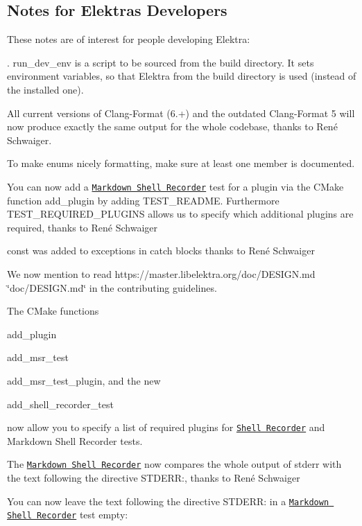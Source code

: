 \subsection*{Notes for Elektra\textquotesingle{}s Developers}

These notes are of interest for people developing Elektra\+:


\begin{DoxyItemize}
\item {\ttfamily . run\+\_\+dev\+\_\+env} is a script to be sourced from the build directory. It sets environment variables, so that Elektra from the build directory is used (instead of the installed one).
\item All current versions of Clang-\/\+Format (6.+) and the outdated Clang-\/\+Format 5 will now produce exactly the same output for the whole codebase, thanks to René Schwaiger.
\item To make enums nicely formatting, make sure at least one member is documented.
\item You can now add a \href{https://master.libelektra.org/tests/shell/shell_recorder/tutorial_wrapper}{\tt Markdown Shell Recorder} test for a plugin via the C\+Make function {\ttfamily add\+\_\+plugin} by adding {\ttfamily T\+E\+S\+T\+\_\+\+R\+E\+A\+D\+ME}. Furthermore {\ttfamily T\+E\+S\+T\+\_\+\+R\+E\+Q\+U\+I\+R\+E\+D\+\_\+\+P\+L\+U\+G\+I\+NS} allows us to specify which additional plugins are required, thanks to René Schwaiger
\item {\ttfamily const} was added to exceptions in catch blocks thanks to René Schwaiger
\item We now mention to read https\+://master.libelektra.\+org/doc/\+D\+E\+S\+I\+GN.md \char`\"{}doc/\+D\+E\+S\+I\+G\+N.\+md\char`\"{} in the contributing guidelines.
\item The C\+Make functions
\begin{DoxyItemize}
\item {\ttfamily add\+\_\+plugin}
\item {\ttfamily add\+\_\+msr\+\_\+test}
\item {\ttfamily add\+\_\+msr\+\_\+test\+\_\+plugin}, and the new
\item {\ttfamily add\+\_\+shell\+\_\+recorder\+\_\+test}
\end{DoxyItemize}

now allow you to specify a list of required plugins for \href{https://master.libelektra.org/tests/shell/shell_recorder}{\tt Shell Recorder} and Markdown Shell Recorder tests.
\item The \href{https://master.libelektra.org/tests/shell/shell_recorder/tutorial_wrapper}{\tt Markdown Shell Recorder} now compares the whole output of {\ttfamily stderr} with the text following the directive {\ttfamily S\+T\+D\+E\+RR\+:}, thanks to René Schwaiger
\item You can now leave the text following the directive {\ttfamily S\+T\+D\+E\+RR\+:} in a \href{https://master.libelektra.org/tests/shell/shell_recorder/tutorial_wrapper}{\tt Markdown Shell Recorder} test empty\+:


\end{DoxyItemize}
